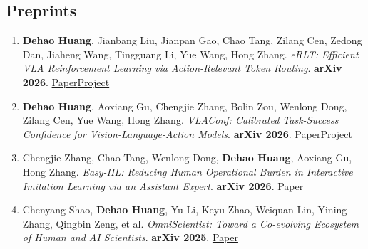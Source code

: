 \subsection*{Preprints}
\begin{enumerate}[label={\arabic*.},leftmargin=1.4em,itemsep=5pt,parsep=0pt,topsep=3pt]
\item \begin{minipage}[t]{\linewidth}\textbf{Dehao Huang}, Jianbang Liu, Jianpan Gao, Chao Tang, Zilang Cen, Zedong Dan, Jiaheng Wang, Tingguang Li, Yue Wang, Hong Zhang. \emph{eRLT: Efficient VLA Reinforcement Learning via Action-Relevant Token Routing}. \textbf{arXiv 2026}. {\small \href{https://arxiv.org/abs/2610.00913}{Paper}\enspace \href{https://red0orange.github.io/eRLT_site/}{Project}}\end{minipage}
\item \begin{minipage}[t]{\linewidth}\textbf{Dehao Huang}, Aoxiang Gu, Chengjie Zhang, Bolin Zou, Wenlong Dong, Zilang Cen, Yue Wang, Hong Zhang. \emph{VLAConf: Calibrated Task-Success Confidence for Vision-Language-Action Models}. \textbf{arXiv 2026}. {\small \href{https://arxiv.org/abs/2605.29605}{Paper}\enspace \href{https://sites.google.com/view/vlaconf}{Project}}\end{minipage}
\item \begin{minipage}[t]{\linewidth}Chengjie Zhang, Chao Tang, Wenlong Dong, \textbf{Dehao Huang}, Aoxiang Gu, Hong Zhang. \emph{Easy-IIL: Reducing Human Operational Burden in Interactive Imitation Learning via an Assistant Expert}. \textbf{arXiv 2026}. {\small \href{https://arxiv.org/abs/2603.12769}{Paper}}\end{minipage}
\item \begin{minipage}[t]{\linewidth}Chenyang Shao, \textbf{Dehao Huang}, Yu Li, Keyu Zhao, Weiquan Lin, Yining Zhang, Qingbin Zeng, et al. \emph{OmniScientist: Toward a Co-evolving Ecosystem of Human and AI Scientists}. \textbf{arXiv 2025}. {\small \href{https://arxiv.org/abs/2511.16931}{Paper}}\end{minipage}
\end{enumerate}
